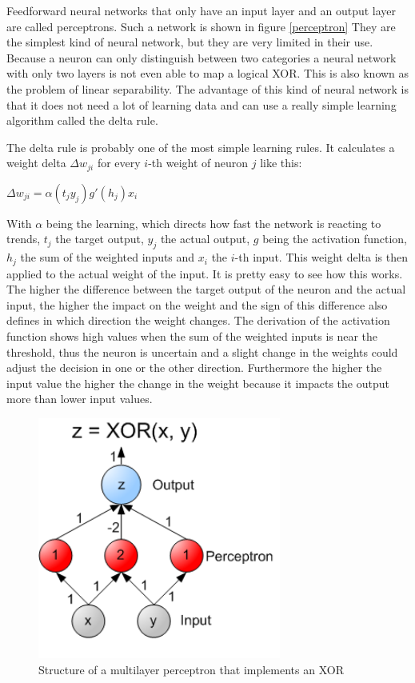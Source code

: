 Feedforward neural networks that only have an input layer and an output layer are called perceptrons. Such a network is shown in figure \ref{perceptron} They are the simplest kind of neural network, but they are very limited in their use. Because a neuron can only distinguish between two categories a neural network with only two layers is not even able to map a logical XOR. This is also known as the problem of linear separability. The advantage of this kind of neural network is that it does not need a lot of learning data and can use a really simple learning algorithm called the delta rule.

The delta rule is probably one of the most simple learning rules. It calculates a weight delta $\Delta w_{ji}$ for every $i$-th weight of neuron $j$ like this:

\begin{center}
	$\Delta w_{ji} = \alpha (t_j  y_j)g'(h_j)x_i$
\end{center}

With $\alpha$ being the learning, which directs how fast the network is reacting to trends, $t_j$ the target output, $y_j$ the actual output, $g$ being the activation function, $h_j$ the sum of the weighted inputs and $x_i$ the $i$-th input. This weight delta is then applied to the actual weight of the input. It is pretty easy to see how this works. The higher the difference between the target output of the neuron and the actual input, the higher the impact on the weight and the sign of this difference also defines in which direction the weight changes. The derivation of the activation function shows high values when the sum of the weighted inputs is near the threshold, thus the neuron is uncertain and a slight change in the weights could adjust the decision in one or the other direction. Furthermore the higher the input value the higher the change in the weight because it impacts the output more than lower input values.

\begin{figure}[ht]
	\centering
  \includegraphics[width=8cm]{figures/multilayer_XOR}
	\caption[Structure of a multilayer perceptron that implements an XOR]{Structure of a multilayer perceptron that implements an XOR \protect\footnotemark}
	\label{multilayer_XOR}
\end{figure}

